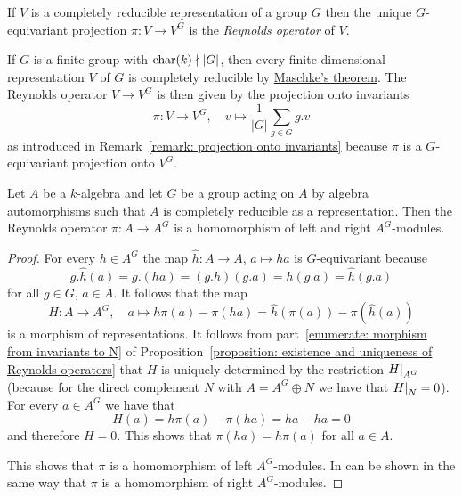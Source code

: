 \begin{definition}
  If $V$ is a completely reducible representation of a group $G$ then the unique $G$-equivariant projection $\pi \colon V \to V^G$ is the \emph{Reynolds operator} of $V$.
\end{definition}


\begin{example}
  If $G$ is a finite group with $\operatorname{char}(k) \nmid |G|$, then every finite-dimensional representation $V$ of $G$ is completely reducible by \hyperref[theorem: maschkes theorem]{Maschke’s theorem}.
  The Reynolds operator $V \to V^G$ is then given by the projection onto invariants
  \[
            \pi
    \colon  V
    \to     V^G,
    \quad   v
    \mapsto \frac{1}{|G|} \sum_{g \in G} g.v
  \]
  as introduced in Remark~\ref{remark: projection onto invariants} because $\pi$ is a $G$-equivariant projection onto $V^G$.
\end{example}


\begin{lemma}
  \label{lemma: reynolds operator is homomorphism}
  Let $A$ be a $k$-algebra and let $G$ be a group acting on $A$ by algebra automorphisms such that $A$ is completely reducible as a representation.
  Then the Reynolds operator $\pi \colon A \to A^G$ is a homomorphism of left and right $A^G$-modules.
\end{lemma}


\begin{proof}
  For every $h \in A^G$ the map $\hat{h} \colon A \to A$, $a \mapsto ha$ is $G$-equivariant because
  \[
      g.\hat{h}(a)
    = g.(ha)
    = (g.h)(g.a)
    = h(g.a)
    = \hat{h}(g.a)
  \]
  for all $g \in G$, $a \in A$.
  It follows that the map
  \[
            H
    \colon  A
    \to     A^G,
    \quad   a
    \mapsto h\pi(a) - \pi(ha)
    =       \hat{h}(\pi(a)) - \pi(\hat{h}(a))
  \]
  is a morphism of representations.
  It follows from part~\ref*{enumerate: morphism from invariants to N} of Proposition~\ref{proposition: existence and uniqueness of Reynolds operators} that $H$ is uniquely determined by the restriction $\restrict{H}{A^G}$ (because for the direct complement $N$ with $A = A^G \oplus N$ we have that $\restrict{H}{N} = 0$).
  For every $a \in A^G$ we have that
  \[
      H(a)
    = h\pi(a) - \pi(ha)
    = ha - ha
    = 0
  \]
  and therefore $H = 0$.
  This shows that $\pi(ha) = h\pi(a)$ for all $a \in A$.
  
  This shows that $\pi$ is a homomorphism of left $A^G$-modules.
  In can be shown in the same way that $\pi$ is a homomorphism of right $A^G$-modules.
\end{proof}



